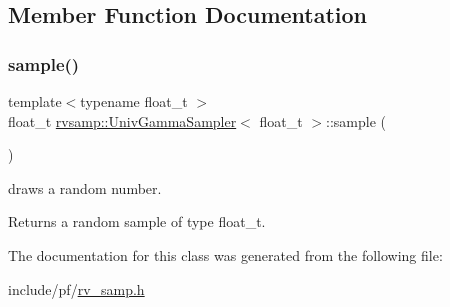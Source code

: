 \subsection{Member Function Documentation}
\mbox{\label{classrvsamp_1_1UnivGammaSampler_ace3479f5d5dca28f56e9953057a92e74}} 
\subsubsection{\texorpdfstring{sample()}{sample()}}
{\footnotesize\ttfamily template$<$typename float\+\_\+t $>$ \\
float\+\_\+t \hyperlink{classrvsamp_1_1UnivGammaSampler}{rvsamp\+::\+Univ\+Gamma\+Sampler}$<$ float\+\_\+t $>$\+::sample (\begin{DoxyParamCaption}{ }\end{DoxyParamCaption})}



draws a random number. 

\begin{DoxyReturn}{Returns}
a random sample of type float\+\_\+t. 
\end{DoxyReturn}


The documentation for this class was generated from the following file\+:\begin{DoxyCompactItemize}
\item 
include/pf/\hyperlink{rv__samp_8h}{rv\+\_\+samp.\+h}\end{DoxyCompactItemize}
